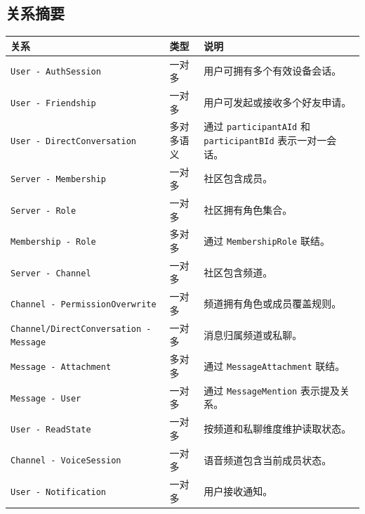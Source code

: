 

\subsection{关系摘要}

\noindent\begin{tabularx}{\textwidth}{L{4.4cm}L{2cm}Y}
  \toprule
  关系 & 类型 & 说明 \\
  \midrule
  \texttt{User - AuthSession} & 一对多 & 用户可拥有多个有效设备会话。 \\
  \texttt{User - Friendship} & 一对多 & 用户可发起或接收多个好友申请。 \\
  \texttt{User - DirectConversation} & 多对多语义 & 通过 \texttt{participantAId} 和 \texttt{participantBId} 表示一对一会话。 \\
  \texttt{Server - Membership} & 一对多 & 社区包含成员。 \\
  \texttt{Server - Role} & 一对多 & 社区拥有角色集合。 \\
  \texttt{Membership - Role} & 多对多 & 通过 \texttt{MembershipRole} 联结。 \\
  \texttt{Server - Channel} & 一对多 & 社区包含频道。 \\
  \texttt{Channel - PermissionOverwrite} & 一对多 & 频道拥有角色或成员覆盖规则。 \\
  \texttt{Channel/DirectConversation - Message} & 一对多 & 消息归属频道或私聊。 \\
  \texttt{Message - Attachment} & 多对多 & 通过 \texttt{MessageAttachment} 联结。 \\
  \texttt{Message - User} & 一对多 & 通过 \texttt{MessageMention} 表示提及关系。 \\
  \texttt{User - ReadState} & 一对多 & 按频道和私聊维度维护读取状态。 \\
  \texttt{Channel - VoiceSession} & 一对多 & 语音频道包含当前成员状态。 \\
  \texttt{User - Notification} & 一对多 & 用户接收通知。 \\
  \bottomrule
\end{tabularx}


